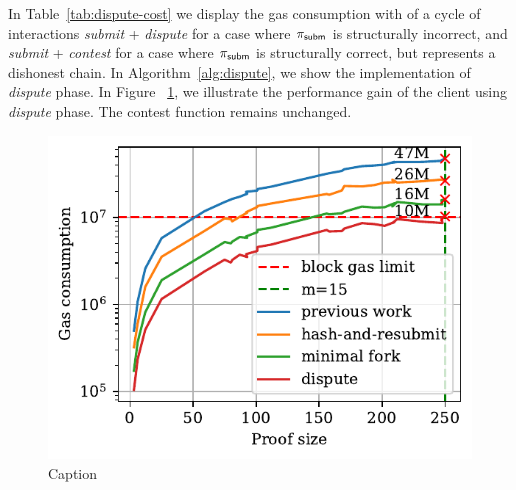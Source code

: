 In Table~\ref{tab:dispute-cost} we display the gas consumption with of
a cycle of interactions \emph{submit} + \emph{dispute} for a case where $\mathsf{\pi_{subm}}$
is structurally incorrect, and \emph{submit} + \emph{contest} for a case where
$\mathsf{\pi_{subm}}$ is structurally correct, but represents a dishonest chain. In
Algorithm~\ref{alg:dispute}, we show the implementation of \emph{dispute}
phase. In Figure ~\ref{fig:dispute}, we illustrate the performance gain of the
client using \emph{dispute} phase. The \textsf{contest} function remains
unchanged.





\begin{figure}[!h]
    \begin{center}
        \includegraphics[width=1\columnwidth]{figures/dispute-phase.pdf}
    \end{center}
    \caption{Caption}
    \label{fig:dispute}
\end{figure}
